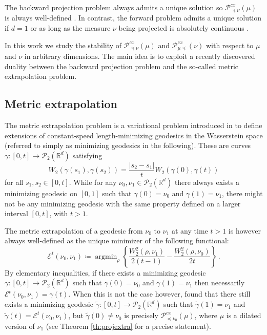 \documentclass[12pt]{amsart}
\def\mc#1{\mathcal{#1}}
\DeclareMathOperator*{\argmin}{argmin}
\begin{document}
The backward projection problem always admits a unique solution so  $\mathscr{P}^{cx}_{\preceq \nu} (\mu)$ is always well-defined \cite{alfonsi2020sampling,gozlan2020mixture,kim2024backward}. In contrast, the forward problem admits a unique solution  if $d=1$ or as long as the measure $\nu$ being projected is absolutely continuous \cite{alfonsi2020sampling,kim2024backward}.


In this work we study the stability of $\mathscr{P}^{cx}_{\preceq \nu} (\mu)$ and $\mathscr{P}^{cx}_{\mu\preceq} (\nu)$ with respect to $\mu$ and $\nu$ in arbitrary dimensions. The main idea is to exploit a recently discovered duality between the backward projection problem and the so-called metric extrapolation problem. 

\subsection{Metric extrapolation} The metric extrapolation problem is a variational problem introduced in \cite{gallouet2024geodesic,Gallouet2025} to define extensions of constant-speed length-minimizing geodesics in the Wasserstein space (referred to simply as  minimizing geodesics in the following). These are curves $\gamma: [0,t] \rightarrow \mc{P}_2(\mathbb{R}^d)$ satisfying
\[
W_2(\gamma(s_1),\gamma(s_2)) = \frac{|s_2-s_1|}{t} W_2(\gamma(0),\gamma(t))
\]
for all $s_1,s_2\in[0,t]$. While for any $\nu_0, \nu_1\in \mc{P}_2(\mathbb{R}^d)$ there always exists a minimizing geodesic on $[0,1]$ such that $\gamma(0)=\nu_0$ and $\gamma(1) = \nu_1$,
there might not be any minimizing geodesic with the same property defined on a larger interval $[0,t]$, with $t>1$.

The metric extrapolation of a geodesic from $\nu_0$ to $\nu_1$ at any time $t>1$ is however always well-defined as the unique minimizer of the following functional:
\begin{equation}\label{eq:extrapolation}
    \mathscr{E}^t(\nu_0,\nu_1)  \coloneqq \argmin_\rho \left\{ \frac{W_2^2(\rho,\nu_1)}{2(t-1)} - \frac{W_2^2(\rho,\nu_0)}{2t} \right\}\,.
\end{equation}
By elementary inequalities, if there exists a minimizing geodesic $\gamma: [0,t] \rightarrow \mc{P}_2(\mathbb{R}^d)$ such that $\gamma(0)=\nu_0$ and $\gamma(1) = \nu_1$ then necessarily $\mathscr{E}^t(\nu_0,\nu_1) = \gamma(t)$. When this is not the case however, \cite{Gallouet2025} found that there still exists a minimizing geodesic $\tilde{\gamma}:[0,t] \rightarrow \mc{P}_2(\mathbb{R}^d)$ such that $\tilde{\gamma}(1) = \nu_1$ and $\tilde{\gamma}(t) = \mathscr{E}^t(\nu_0,\nu_1) $, but $\tilde{\gamma}(0) \neq \nu_0$ is precisely $\mathscr{P}_{\preceq \nu_0}^{cx}(\mu)$, where $\mu$ is a dilated version of $\nu_1$ (see Theorem \ref{th:projextra} for a precise statement).
\end{document}
